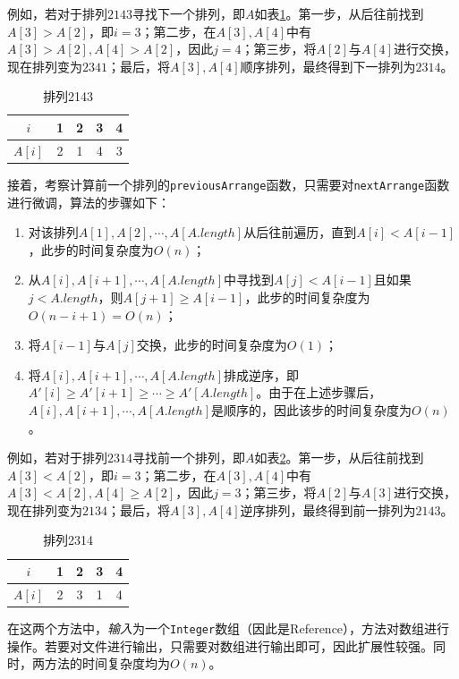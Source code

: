 \documentclass[11pt]{homework}
\begin{document}
  例如，若对于排列$2143$寻找下一个排列，即$A$如表\ref{2143}。第一步，从后往前找到$A[3] > A[2]$，即$i = 3$；第二步，在$A[3], A[4]$中有$A[3]> A[2], A[4]> A[2]$，因此$j = 4$；第三步，将$A[2]$与$A[4]$进行交换，现在排列变为$2341$；最后，将$A[3], A[4]$顺序排列，最终得到下一排列为$2314$。
  \begin{table}[]
    \centering
    \begin{tabular}{|c|c|c|c|c|}
    \hline
    $i$    & 1 & 2 & 3 & 4 \\ \hline
    $A[i]$ & 2 & 1 & 4 & 3 \\ \hline
    \end{tabular}
    \caption{排列2143}
    \label{2143}
  \end{table}

  接着，考察计算前一个排列的\verb|previousArrange|函数，只需要对\verb|nextArrange|函数进行微调，算法的步骤如下：
  \begin{enumerate}
    \item 对该排列$A[1], A[2], \cdots, A[A.length]$从后往前遍历，直到$A[i] < A[i - 1]$，此步的时间复杂度为$O(n)$；
    \item 从$A[i], A[i+1], \cdots, A[A.length]$中寻找到$A[j] < A[i - 1]$且如果$j < A.length$，则$A[j + 1] \geq A[i - 1]$，此步的时间复杂度为$O(n - i + 1) = O(n)$；
    \item 将$A[i - 1]$与$A[j]$交换，此步的时间复杂度为$O(1)$；
    \item 将$A[i], A[i+1], \cdots, A[A.length]$排成逆序，即$A'[i] \geq A'[i+1] \geq \cdots \geq A'[A.length]$。由于在上述步骤后，$A[i], A[i+1], \cdots, A[A.length]$是顺序的，因此该步的时间复杂度为$O(n)$。
  \end{enumerate}

  例如，若对于排列$2314$寻找前一个排列，即$A$如表\ref{2314}。第一步，从后往前找到$A[3] < A[2]$，即$i = 3$；第二步，在$A[3], A[4]$中有$A[3]< A[2], A[4]\geq A[2]$，因此$j = 3$；第三步，将$A[2]$与$A[3]$进行交换，现在排列变为$2134$；最后，将$A[3], A[4]$逆序排列，最终得到前一排列为$2143$。
  \begin{table}[]
    \centering
    \begin{tabular}{|c|c|c|c|c|}
    \hline
    $i$    & 1 & 2 & 3 & 4 \\ \hline
    $A[i]$ & 2 & 3 & 1 & 4 \\ \hline
    \end{tabular}
    \caption{排列2314}
    \label{2314}
  \end{table}

  在这两个方法中，\emph{输入}为一个\verb|Integer|数组（因此是Reference），方法对数组进行操作。若要对文件进行输出，只需要对数组进行输出即可，因此扩展性较强。同时，两方法的时间复杂度均为$O(n)$。
\end{document}

